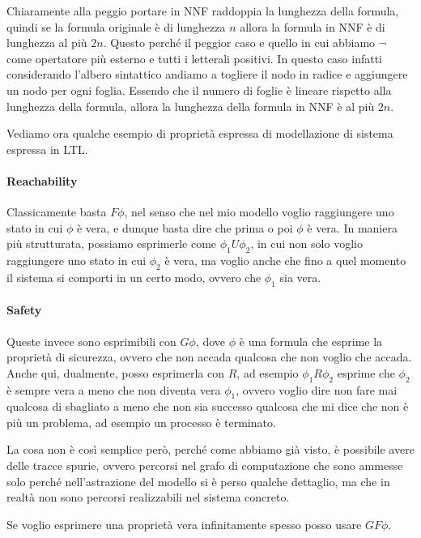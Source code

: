 Chiaramente alla peggio portare in NNF raddoppia la lunghezza della formula, quindi se la formula originale è di lunghezza \(n\) allora la formula in NNF è di lunghezza al più \(2n\). Questo perché il peggior caso e quello in cui abbiamo \(\neg\) come opertatore più esterno e tutti i letterali positivi. In questo caso infatti considerando l'albero sintattico andiamo a togliere il nodo in radice e aggiungere un nodo per ogni foglia. Essendo che il numero di foglie è lineare rispetto alla lunghezza della formula, allora la lunghezza della formula in NNF è al più \(2n\).

Vediamo ora qualche esempio di proprietà espressa di modellazione di sistema espressa in LTL\@.

\paragraph{Reachability}

Classicamente basta \(F\phi\), nel senso che nel mio modello voglio raggiungere uno stato in cui \(\phi\) è vera, e dunque basta dire che prima o poi \(\phi\) è vera. In maniera più strutturata, possiamo esprimerle come \(\phi_1 U \phi_2\), in cui non solo voglio raggiungere uno stato in cui \(\phi_2\) è vera, ma voglio anche che fino a quel momento il sistema si comporti in un certo modo, ovvero che \(\phi_1\) sia vera.

\paragraph{Safety}
Queste invece sono esprimibili con \(G\phi\), dove \(\phi\) è una formula che esprime la proprietà di sicurezza, ovvero che non accada qualcosa che non voglio che accada. Anche qui, dualmente, posso esprimerla con \(R\), ad esempio \(\phi_1 R \phi_2\) esprime che \(\phi_2\) è sempre vera a meno che non diventa vera \(\phi_1\), ovvero voglio dire non fare mai qualcosa di sbagliato a meno che non sia successo qualcosa che mi dice che non è più un problema, ad esempio un processo è terminato.

La cosa non è così semplice però, perché come abbiamo già visto, è possibile avere delle tracce spurie, ovvero percorsi nel grafo di computazione che sono ammesse solo perché nell'astrazione del modello si è perso qualche dettaglio, ma che in realtà non sono percorsi realizzabili nel sistema concreto.

Se voglio esprimere una proprietà vera infinitamente spesso posso usare \(G F \phi\).

